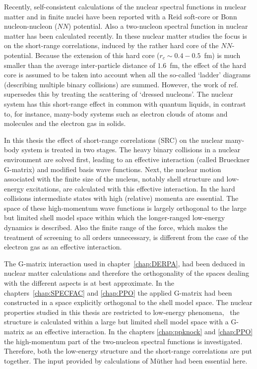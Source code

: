 Recently, self-consistent calculations of the nuclear spectral functions in 
nuclear matter\cite{RPD89,VDP93} 
and in finite nuclei\cite{MD94} have been reported 
with a Reid soft-core or Bonn nucleon-nucleon ($NN$)
 potential. Also a two-nucleon spectral 
function in nuclear matter has been calculated recently\cite{GDPR95}. In 
these nuclear matter studies the focus is on the short-range correlations, 
induced by the rather hard core of  the $NN$-potential. 
Because the extension of this hard core ($r_c \sim 0.4-0.5$~fm) 
is much smaller than the average inter-particle distance of 
$1.6$~fm,  the effect of the hard core is assumed to be taken into account when
all the so-called `ladder' diagrams (describing multiple binary collisions) 
are summed. However, the work of ref.~\cite{GDPR95} supersedes 
this by treating the scattering of `dressed nucleons'.
The nuclear system has this short-range effect in common with 
quantum liquids, in contrast 
to, for instance, 
many-body systems such as electron clouds of atoms and molecules 
and the electron 
gas in solids. 

In this thesis the effect of short-range correlations (SRC) on the
nuclear many-body system is treated in two stages. The heavy 
binary collisions in a nuclear environment are solved first, 
leading to an effective interaction (called Brueckner G-matrix)
and modified basis wave functions. Next, the nuclear 
motion associated with the finite size of the nucleus, 
notably shell structure and low-energy 
excitations, are calculated with this effective interaction. 
In the hard collisions intermediate states 
with high (relative) momenta are essential. The space of these high-momentum 
wave functions is largely orthogonal to the large but limited shell model 
space within which the longer-ranged low-energy dynamics is 
described.
Also the finite range of the force, which makes the treatment of screening to 
all orders unnecessary, is different from the case of the electron 
gas\cite{KE88} as an effective interaction. 

The G-matrix interaction used in 
chapter~\ref{chap:DERPA}, had been deduced in nuclear matter calculations and 
therefore 
the orthogonality of the spaces dealing with the different aspects is at best 
approximate. In the chapters~\ref{chap:SPECFAC} and \ref{chap:PPO} the 
applied G-matrix 
had been constructed in a space explicitly orthogonal to the shell model space.
The nuclear properties studied in this thesis are 
restricted to low-energy phenomena, \ie\ the structure is calculated
within a large but limited shell model space with a G-matrix as an effective 
interaction.
In the chapters \ref{chap:ppknock} and \ref{chap:PPO} the 
high-momentum part of the two-nucleon spectral functions is investigated.
Therefore, both the low-energy structure and the short-range correlations 
are put together. The input provided by calculations of 
M\"uther\cite{MS93a} had been essential here.

